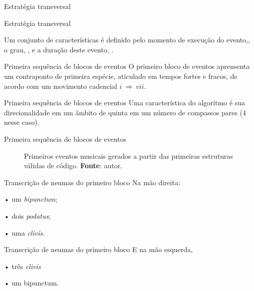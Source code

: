 \documentclass[aspectratio=169]{beamer}
\begin{document}
\begin{frame}{Estratégia transversal}

\end{frame}

\begin{frame}{Estratégia transversal}

\end{frame}

\begin{frame}
Um conjunto de características é definido pelo momento de execução do evento,, o grau, , e a duração deste evento, . 
\end{frame}

\begin{frame}{Primeira sequência de blocos de eventos}
O primeiro bloco de eventos  aprensenta um contraponto de primeira espécie, aticulado em tempos fortes e fracos, de acordo com um movimento cadencial $i~\Rightarrow~vii$.
\end{frame}

\begin{frame}{Primeira sequência de blocos de eventos}
Uma característica  do algoritmo é sua direcionalidade em um âmbito de quinta em um número de compassos pares (4 nesse caso). 
\end{frame}

\begin{frame}{Primeira sequência de blocos de eventos}
\begin{figure}[!h]
  \centering
  
  \caption{Primeiros eventos musicais gerados a partir das primeiras estruturas válidas de código. \textbf{Fonte}: autor.}
  \label{fig:ask3}
\end{figure}
\end{frame}


\begin{frame}{Transcrição de neumas do primeiro bloco}\label{fig:neumaMD1}
Na mão direita:

• um \emph{bipunctum};

• dois \emph{podatus};

• uma \emph{clivis}. 
\end{frame}

\begin{frame}{Transcrição de neumas do primeiro bloco}\label{fig:neumaMD1}
E na mão esquerda, 

• três \emph{clivis}

• um bipunctum.
\end{frame} 
\end{document}
